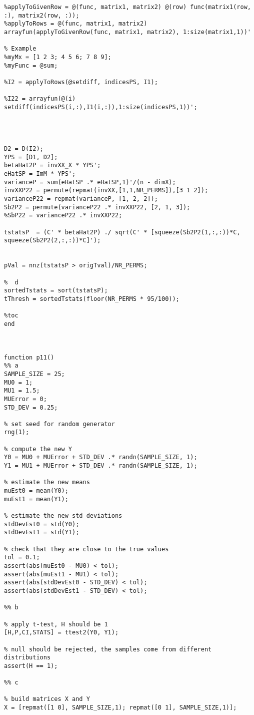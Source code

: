 \documentclass[11pt,a4paper,oneside]{report}
\begin{document}
\begin{lstlisting}
%applyToGivenRow = @(func, matrix1, matrix2) @(row) func(matrix1(row, :), matrix2(row, :));
%applyToRows = @(func, matrix1, matrix2) arrayfun(applyToGivenRow(func, matrix1, matrix2), 1:size(matrix1,1))'

% Example
%myMx = [1 2 3; 4 5 6; 7 8 9];
%myFunc = @sum;

%I2 = applyToRows(@setdiff, indicesPS, I1);

%I22 = arrayfun(@(i) setdiff(indicesPS(i,:),I1(i,:)),1:size(indicesPS,1))';




D2 = D(I2);
YPS = [D1, D2];
betaHat2P = invXX_X * YPS';
eHatSP = ImM * YPS';
varianceP = sum(eHatSP .* eHatSP,1)'/(n - dimX);
invXXP22 = permute(repmat(invXX,[1,1,NR_PERMS]),[3 1 2]);
varianceP22 = repmat(varianceP, [1, 2, 2]);
Sb2P2 = permute(varianceP22 .* invXXP22, [2, 1, 3]);
%SbP22 = varianceP22 .* invXXP22;

tstatsP  = (C' * betaHat2P) ./ sqrt(C' * [squeeze(Sb2P2(1,:,:))*C, squeeze(Sb2P2(2,:,:))*C]');


pVal = nnz(tstatsP > origTval)/NR_PERMS;

%  d
sortedTstats = sort(tstatsP);
tThresh = sortedTstats(floor(NR_PERMS * 95/100));

%toc 
end



function p11()
%% a
SAMPLE_SIZE = 25;
MU0 = 1;
MU1 = 1.5;
MUError = 0;
STD_DEV = 0.25;

% set seed for random generator
rng(1);

% compute the new Y
Y0 = MU0 + MUError + STD_DEV .* randn(SAMPLE_SIZE, 1);
Y1 = MU1 + MUError + STD_DEV .* randn(SAMPLE_SIZE, 1);

% estimate the new means
muEst0 = mean(Y0);
muEst1 = mean(Y1);

% estimate the new std deviations
stdDevEst0 = std(Y0);
stdDevEst1 = std(Y1);

% check that they are close to the true values
tol = 0.1;
assert(abs(muEst0 - MU0) < tol);
assert(abs(muEst1 - MU1) < tol);
assert(abs(stdDevEst0 - STD_DEV) < tol);
assert(abs(stdDevEst1 - STD_DEV) < tol);

%% b

% apply t-test, H should be 1
[H,P,CI,STATS] = ttest2(Y0, Y1);

% null should be rejected, the samples come from different distributions
assert(H == 1); 

%% c 

% build matrices X and Y
X = [repmat([1 0], SAMPLE_SIZE,1); repmat([0 1], SAMPLE_SIZE,1)];


\end{lstlisting}
\end{document}
